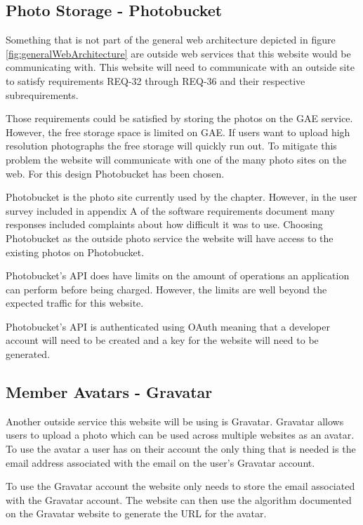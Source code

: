 \documentclass{article}
\begin{document}
\subsection{Photo Storage - Photobucket}

Something that is not part of the general web architecture depicted in figure \ref{fig:generalWebArchitecture} are outside
web services that this website would be communicating with. This website will need to communicate with an outside site to satisfy requirements REQ-32 through REQ-36 and their respective subrequirements. \cite{schwab_apo_srs_2012}

Those requirements could be satisfied by storing the photos on the GAE service. However, the free storage space is limited
on GAE. If users want to upload high resolution photographs the free storage will quickly run out. To mitigate this problem
the website will communicate with one of the many photo sites on the web. For this design Photobucket has been chosen. \cite{_photobucket_2012}

Photobucket is the photo site currently used by the chapter. However, in the user survey included in appendix A of 
the software requirements document many responses included complaints about how difficult it was to use.\cite{schwab_apo_srs_2012}  Choosing Photobucket as the outside photo service the website will have access to the existing photos on Photobucket.

Photobucket's API does have limits on the amount of operations an application can perform before being charged. \cite{photobucket_method_2010} However, the limits are well beyond the expected traffic for this website.

Photobucket's API is authenticated using OAuth meaning that a developer account will need to be created and a key for the
website will need to be generated. \cite{photobucket_faq_2010}

\subsection{Member Avatars - Gravatar}

Another outside service this website will be using is Gravatar. \cite{_gravatar} Gravatar allows users to upload a photo which can be used across multiple websites as an avatar. To use the avatar a user has on their account the only thing that is needed
is the email address associated with the email on the user's Gravatar account. 

To use the Gravatar account the website only needs to store the email associated with the Gravatar account. The website
can then use the algorithm documented on the Gravatar website to generate the URL for the avatar.
\end{document}
